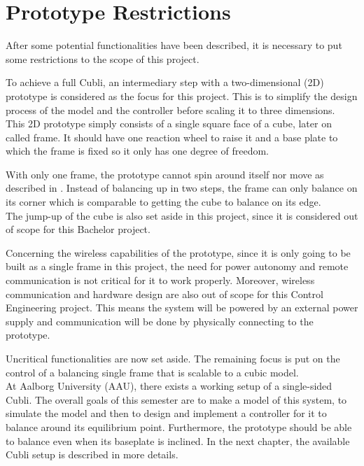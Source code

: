 \section{Prototype Restrictions}\label{sec:protoRestrictions}
After some potential functionalities have been described, it is necessary to put some restrictions to the scope of this project.

To achieve a full Cubli, an intermediary step with a two-dimensional (2D) prototype is considered as the focus for this project. This is to simplify the design process of the model and the controller before scaling it to three dimensions.\\
This 2D prototype simply consists of a single square face of a cube, later on called frame. It should have one reaction wheel to raise it and a base plate to which the frame is fixed so it only has one degree of freedom.

With only one frame, the prototype cannot spin around itself nor move as described in . Instead of balancing up in two steps, the frame can only balance on its corner which is comparable to getting the cube to balance on its edge.\\
The jump-up of the cube is also set aside in this project, since it is considered out of scope for this Bachelor project.

Concerning the wireless capabilities of the prototype, since it is only going to be built as a single frame in this project, the need for power autonomy and remote communication is not critical for it to work properly. Moreover, wireless communication and hardware design are also out of scope for this Control Engineering project. This means the system will be powered by an external power supply and communication will be done by physically connecting to the prototype.

Uncritical functionalities are now set aside. The remaining focus is put on the control of a balancing single frame that is scalable to a cubic model.\\
At Aalborg University (AAU), there exists a working setup of a single-sided Cubli. The overall goals of this semester are to make a model of this system, to simulate the model and then to design and implement a controller for it to balance around its equilibrium point. Furthermore, the prototype should be able to balance even when its baseplate is inclined.
In the next chapter, the available Cubli setup is described in more details.



